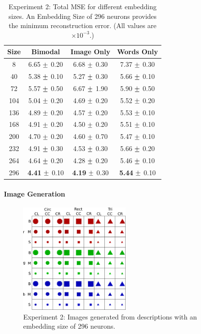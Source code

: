 \begin{table}
\centering
	\begin{tabular}{|c|c|c|c|}
	\hline
	\textbf{Size} & 	\textbf{Bimodal} & 	\textbf{Image Only} 	& 	\textbf{Words Only} \\ \hline
8	&	6.65	$\mypm$	0.20	&	6.68	$\mypm$	0.30	&	7.37	$\mypm$	0.30	\\ \hline
40	&	5.38	$\mypm$	0.10	&	5.27	$\mypm$	0.30	&	5.66	$\mypm$	0.10	\\ \hline
72	&	5.57	$\mypm$	0.50	&	6.67	$\mypm$	1.90	&	5.90	$\mypm$	0.50	\\ \hline
104	&	5.04	$\mypm$	0.20	&	4.69	$\mypm$	0.20	&	5.52	$\mypm$	0.20	\\ \hline
136	&	4.89	$\mypm$	0.20	&	4.57	$\mypm$	0.20	&	5.53	$\mypm$	0.10	\\ \hline
168	&	4.91	$\mypm$	0.20	&	4.50	$\mypm$	0.20	&	5.51	$\mypm$	0.10	\\ \hline
200	&	4.70	$\mypm$	0.20	&	4.60	$\mypm$	0.70	&	5.47	$\mypm$	0.10	\\ \hline
232	&	4.91	$\mypm$	0.30	&	4.53	$\mypm$	0.30	&	5.66	$\mypm$	0.20	\\ \hline
264	&	4.64	$\mypm$	0.20	&	4.28	$\mypm$	0.20	&	5.46	$\mypm$	0.10	\\ \hline
296	&	\textbf{4.41}	$\mypm$	0.10	&	\textbf{4.19}	$\mypm$	0.30	&	\textbf{5.44}	$\mypm$	0.10	\\ \hline

	\end{tabular}
\caption{Experiment 2:  Total MSE for different embedding sizes. An Embedding Size of 296 neurons provides the minimum reconstruction error. (All values are $\times10^{-3}$.)}
\label{tab:res333}
\end{table}


\paragraph{Image Generation}

\begin{figure}[h]
\centering
\includegraphics[width=0.5\textwidth]{Figs/shapes/multiword333.png}
\caption{Experiment 2: Images generated from descriptions with an embedding size of 296 neurons.}
\label{fig:333multi}
\end{figure}

